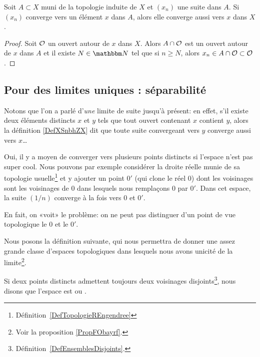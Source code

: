 \begin{lemma}   \label{LemPESaiVw}
    Soit \( A\subset X\) muni de la topologie induite de \( X\) et \( (x_n)\) une suite dans \( A\). Si \( (x_n) \) converge vers un élément \( x \) dans \(A \), alors elle converge aussi vers \(x \) dans \( X \).
\end{lemma}

\begin{proof}
    Soit \( \mathcal{O}\) un ouvert autour de \( x\) dans \( X\). Alors \( A\cap\mathcal{O}\) est un ouvert autour de \( x\) dans \( A\) et il existe \( N\in \eN\) tel que si \( n\geq N\), alors \( x_n\in A\cap\mathcal{O}\subset\mathcal{O}\).
\end{proof}

\subsection{Pour des limites uniques : séparabilité}

Notons que l'on a parlé d'\emph{une} limite de suite jusqu'à présent: en effet, s'il existe deux éléments distincts $x$ et $y$ tels que tout ouvert contenant $x$ contient $y$, alors la définition \ref{DefXSnbhZX} dit que toute suite convergeant vers $y$ converge aussi vers $x$\dots


\begin{example} \label{EXooSHKAooZQEVLB}
    Oui, il y a moyen de converger vers plusieurs points distincts si l'espace n'est pas super cool. Nous pouvons par exemple\cite{EJVQuas} considérer la droite réelle munie de sa topologie usuelle\footnote{Définition~\ref{DefTopologieREngendree}} et y ajouter un point $0'$ (qui clone le réel $0$) dont les voisinages sont les voisinages de $0$ dans lesquels nous remplaçons $0$ par $0'$. Dans cet espace, la suite $(1/n)$ converge à la fois vers $0$ et $0'$.


    En fait, on «voit» le problème: on ne peut pas distinguer d'un point de vue topologique le $0$ et le $0'$.
\end{example}

Nous posons la définition suivante, qui nous permettra de donner une assez grande classe d'espaces topologiques dans lesquels nous avons unicité de la limite\footnote{Voir la proposition \ref{PropFObayrf}.}.
\begin{definition}  \label{DefYFmfjjm}\label{DefWEOTrVl}
    Si deux points distincts admettent toujours deux voisinages disjoints\footnote{Définition~\ref{DefEnsemblesDisjoints}.}, nous disons que l'espace est  ou .
\end{definition}

